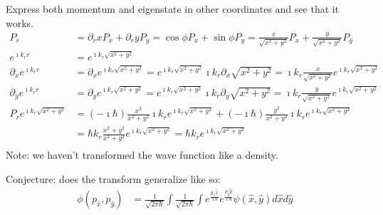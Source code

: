 \documentclass[11pt]{article}
\begin{document}
Express both momentum and eigenstate in other coordinates and see that it works.
\begin{equation}
	\begin{aligned}
		P_r &= \partial_r x P_x + \partial_r y P_y = \cos \phi P_x + \sin \phi P_y = \frac{x}{\sqrt{x^2 + y^2}} P_x + \frac{y}{\sqrt{x^2 + y^2}} P_y  \\
		e^{\imath k_r r} &= e^{\imath k_r \sqrt{x^2 + y^2}}\\
		\partial_x e^{\imath k_r r} &= \partial_x e^{\imath k_r \sqrt{x^2 + y^2}} = e^{\imath k_r \sqrt{x^2 + y^2}} \imath k_r \partial_x \sqrt{x^2 + y^2} = \imath k_r \frac{x}{\sqrt{x^2 + y^2}} e^{\imath k_r \sqrt{x^2 + y^2}} \\
		\partial_y e^{\imath k_r r} &= \partial_y e^{\imath k_r \sqrt{x^2 + y^2}} = e^{\imath k_r \sqrt{x^2 + y^2}} \imath k_r \partial_y \sqrt{x^2 + y^2} = \imath k_r \frac{y}{\sqrt{x^2 + y^2}} e^{\imath k_r \sqrt{x^2 + y^2}} \\
		P_r e^{\imath k_r \sqrt{x^2 + y^2}} &= (-\imath \hbar ) \frac{x^2}{x^2 + y^2} \imath k_r e^{\imath k_r \sqrt{x^2 + y^2}} +(-\imath \hbar ) \frac{y^2}{x^2 + y^2} \imath k_r e^{\imath k_r \sqrt{x^2 + y^2}} \\
		&= \hbar k_r \frac{x^2 + y^2}{x^2 + y^2} e^{\imath k_r \sqrt{x^2 + y^2}} = \hbar k_r e^{\imath k_r \sqrt{x^2 + y^2}} \\
	\end{aligned}
\end{equation}
Note: we haven't transformed the wave function like a density.


Conjecture: does the transform generalize like so:
\begin{equation}
	\begin{aligned}
		\phi(p_{\hat{x}}, p_{\hat{y}}) &= \frac{1}{\sqrt{2 \pi \hbar}} \int \frac{1}{\sqrt{2 \pi \hbar}} \int e^{\frac{p_{\hat{x}} \hat{x}}{\imath \hbar}} e^{\frac{p_{\hat{y}} \hat{y}}{\imath \hbar}} \psi(\hat{x}, \hat{y}) d\hat{x}d\hat{y} \\
	\end{aligned}
\end{equation}
\end{document}
